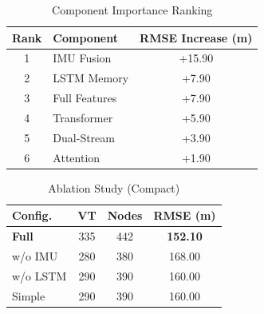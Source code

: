 \begin{table}[htbp]
\centering
\caption{Component Importance Ranking}
\label{tab:component_importance}
\begin{tabular}{c|l|c}
\hline
\textbf{Rank} & \textbf{Component} & \textbf{RMSE Increase (m)} \\
\hline
1 & IMU Fusion & +15.90 \\
2 & LSTM Memory & +7.90 \\
3 & Full Features & +7.90 \\
4 & Transformer & +5.90 \\
5 & Dual-Stream & +3.90 \\
6 & Attention & +1.90 \\
\hline
\end{tabular}
\end{table}

\begin{table}[htbp]
\centering
\caption{Ablation Study (Compact)}
\label{tab:ablation_compact}
\small
\begin{tabular}{l|cc|c}
\hline
\textbf{Config.} & \textbf{VT} & \textbf{Nodes} & \textbf{RMSE (m)} \\
\hline
\textbf{Full} & 335 & 442 & \textbf{152.10} \\
w/o IMU & 280 & 380 & 168.00 \\
w/o LSTM & 290 & 390 & 160.00 \\
Simple & 290 & 390 & 160.00 \\
\hline
\end{tabular}
\end{table}

